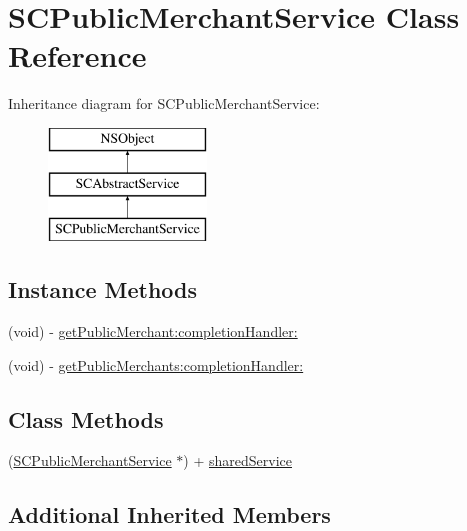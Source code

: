 \hypertarget{interface_s_c_public_merchant_service}{}\section{S\+C\+Public\+Merchant\+Service Class Reference}
\label{interface_s_c_public_merchant_service}
Inheritance diagram for S\+C\+Public\+Merchant\+Service\+:\begin{figure}[H]
\begin{center}
\leavevmode
\includegraphics[height=3.000000cm]{interface_s_c_public_merchant_service}
\end{center}
\end{figure}
\subsection*{Instance Methods}
\begin{DoxyCompactItemize}
\item 
(void) -\/ \hyperlink{interface_s_c_public_merchant_service_ace6f378120955333c0d6ff8394ce5fa4}{get\+Public\+Merchant\+:completion\+Handler\+:}
\item 
(void) -\/ \hyperlink{interface_s_c_public_merchant_service_aef32ab09037c99f5fd45c50372057fbd}{get\+Public\+Merchants\+:completion\+Handler\+:}
\end{DoxyCompactItemize}
\subsection*{Class Methods}
\begin{DoxyCompactItemize}
\item 
(\hyperlink{interface_s_c_public_merchant_service}{S\+C\+Public\+Merchant\+Service} $\ast$) + \hyperlink{interface_s_c_public_merchant_service_ac924d6ade68a4e5b3a2d581a13edd8cc}{shared\+Service}
\end{DoxyCompactItemize}
\subsection*{Additional Inherited Members}



